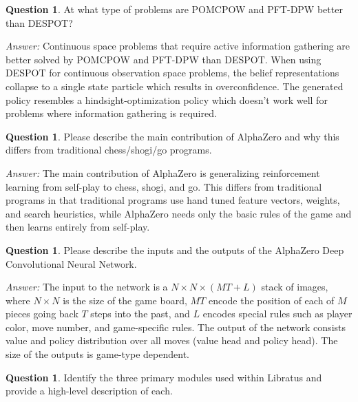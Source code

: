 \documentclass{article}
\theoremstyle{definition}
\newtheorem{question}[thm]{Question}
\newenvironment{answer}{\noindent\textit{Answer:}}{}
\begin{document}
\begin{question}
At what type of problems are POMCPOW and PFT-DPW better than DESPOT?  
\end{question}

\begin{answer}
Continuous space problems that require active information gathering are better solved by POMCPOW and PFT-DPW than DESPOT. When using DESPOT for continuous observation space problems, the belief representations collapse to a single state particle which results in overconfidence. The generated policy resembles a hindsight-optimization policy which doesn't work well for problems where information gathering is required.
\end{answer}

\begin{question}
Please describe the main contribution of AlphaZero and why this differs from traditional chess/shogi/go programs.
\end{question}

\begin{answer}
The main contribution of AlphaZero is generalizing reinforcement learning from self-play to chess, shogi, and go. This differs from traditional programs in that traditional programs use hand tuned feature vectors, weights, and search heuristics, while AlphaZero needs only the basic rules of the game and then learns entirely from self-play.
\end{answer}

\begin{question}
Please describe the inputs and the outputs of the AlphaZero Deep Convolutional Neural Network.
\end{question}

\begin{answer}
The input to the network is a $N \times N \times (MT + L)$ stack of images, where $N \times N$ is the size of the game board, $MT$ encode the position of each of $M$ pieces going back $T$ steps into the past, and $L$ encodes special rules such as player color, move number, and game-specific rules. The output of the network consists value and policy distribution over all moves (value head and policy head). The size of the outputs is game-type dependent.
\end{answer}

\begin{question}
Identify the three primary modules used within Libratus and provide a high-level description of each.
\end{question}
\end{document}
